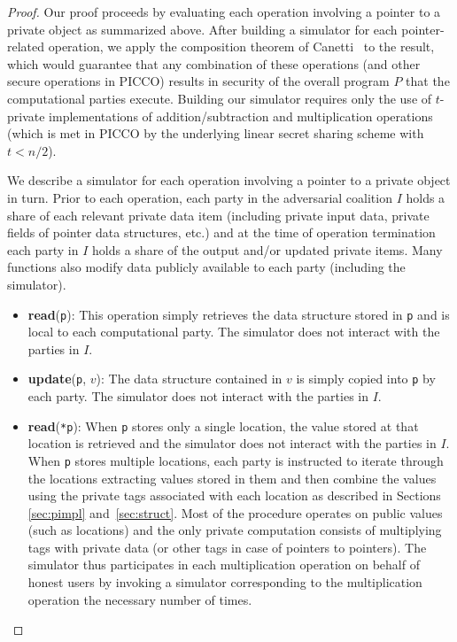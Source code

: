 \documentclass[11pt]{article}
\begin{document}
\begin{proof}
Our proof proceeds by evaluating each operation involving a pointer to
a private object as summarized above. After building a simulator for
each pointer-related operation, we apply the composition theorem of
Canetti~\cite{can00} to the result, which would guarantee that any
combination of these operations (and other secure operations in PICCO)
results in security of the overall program $P$ that the computational
parties execute. Building our simulator requires only the use of $t$-private
implementations of addition/subtraction and multiplication operations (which
is met in PICCO by the underlying linear secret sharing scheme with $t <
n/2$).

We describe a simulator for each operation involving a pointer to a private
object in turn. Prior to each operation, each party in the adversarial
coalition $I$ holds a share of each relevant private data item (including
private input data, private fields of pointer data structures, etc.) and at
the time of operation termination each party in $I$ holds a share of the
output and/or updated private items. Many functions also modify data
publicly available to each party (including the simulator).
\begin{itemize}
  \item \textbf{read}(\texttt{p}): This operation simply retrieves the data
    structure stored in \texttt{p} and is local to each computational party.
    The simulator does not interact with the parties in $I$.
    
  \item \textbf{update}(\texttt{p}, $v$): The data structure contained in
    $v$ is simply copied into \texttt{p} by each party. The simulator does
    not interact with the parties in $I$.
    
  \item \textbf{read}(\texttt{*p}): When \texttt{p} stores only a single
    location, the value stored at that location is retrieved and the
    simulator does not interact with the parties in $I$. When
    \texttt{p} stores multiple locations, each party is instructed to
    iterate through the locations extracting values stored in them and
    then combine the values using the private tags associated with
    each location as described in Sections \ref{sec:pimpl}
    and~\ref{sec:struct}. Most of the procedure operates on public
    values (such as locations) and the only private computation
    consists of multiplying tags with private data (or other tags in
    case of pointers to pointers). The simulator thus participates in
    each multiplication operation on behalf of honest users by
    invoking a simulator corresponding to the multiplication operation
    the necessary number of times.
    

\end{itemize}
\end{proof}
\end{document}
